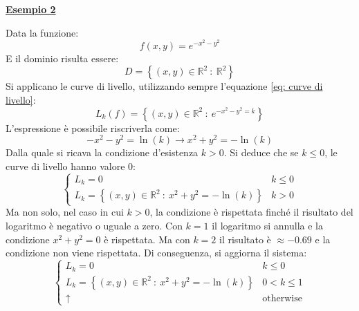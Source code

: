 \documentclass[a4paper]{article}
\newcommand{\example}[1]{\textcolor{Green4}{\textbf{#1}}}
\begin{document}
	\begin{flushleft}
		\example{\underline{Esempio 2}}
	\end{flushleft}
	Data la funzione:
	\begin{equation*}
		f\left(x,y\right) = e^{-x^{2}-y^{2}}
	\end{equation*}
	E il dominio risulta essere:
	\begin{equation*}
		D = \left\{\left(x,y\right) \in \mathbb{R}^{2} \: : \: \mathbb{R}^{2}\right\}
	\end{equation*}
	Si applicano le curve di livello, utilizzando sempre l'equazione \ref{eq: curve di livello}:
	\begin{equation*}
		L_{k}\left(f\right) = \left\{\left(x,y\right) \in \mathbb{R}^{2} \: : \: e^{-x^{2}-y^{2} = k}\right\}
	\end{equation*}
	L'espressione è possibile riscriverla come:
	\begin{equation*}
		-x^{2}-y^{2} = \ln\left(k\right) \rightarrow x^{2} + y^{2} = -\ln\left(k\right)
	\end{equation*}
	Dalla quale si ricava la condizione d'esistenza $k > 0$. Si deduce che se $k \le 0$, le curve di livello hanno valore $0$:
	\begin{equation*}
		\begin{cases}
			L_{k} = 0 & k \le 0 \\
			L_{k} = \left\{\left(x,y\right) \in \mathbb{R}^{2} \: : \: x^{2}+y^{2} = -\ln\left(k\right)\right\} & k > 0
		\end{cases}
	\end{equation*}
	Ma non solo, nel caso in cui $k > 0$, la condizione è rispettata finché il risultato del logaritmo è negativo o uguale a zero. Con $k = 1$ il logaritmo si annulla e la condizione $x^{2} + y^{2} = 0$ è rispettata. Ma con $k = 2$ il risultato è $\approx - 0.69$ e la condizione non viene rispettata. Di conseguenza, si aggiorna il sistema:
	\begin{equation*}
		\begin{cases}
			L_{k} = 0 & k \le 0 \\
			L_{k} = \left\{\left(x,y\right) \in \mathbb{R}^{2} \: : \: x^{2}+y^{2} = -\ln\left(k\right)\right\} & 0 < k \le 1 \\
			\uparrow & \text{otherwise}
		\end{cases}
	\end{equation*}\newpage
\end{document}
